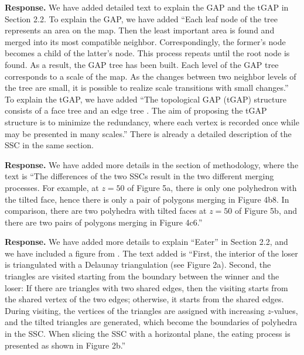 \documentclass[a4paper,twoside,11pt]{reviewresponse}
\begin{document}
\textbf{Response.}
We have added detailed text to explain the GAP and the tGAP 
in Section 2.2.
To explain the GAP, we have added
``Each leaf node of the tree represents an area on the map.
Then the least important area is found and 
merged into its most compatible neighbor.
Correspondingly, the former's node 
becomes a child of the latter's node.
This process repeats until the root node is found.
As a result, the GAP tree has been built.
Each level of the GAP tree corresponds to a scale of the map.
As the changes between two neighbor levels of the tree are small,
it is possible to realize scale transitions with small changes.''
To explain the tGAP, we have added 
``The topological GAP (tGAP) structure 
consists of a face tree and an edge tree \citep{vanOosterom2005}.
The aim of proposing the tGAP structure is to minimize the redundancy,
where each vertex is recorded once while may be presented in many scales.''
There is already a detailed description of the SSC in the same section.

\textbf{Response.}
We have added more details in the section of methodology,
where the text is
``The differences of the two SSCs result in 
the two different merging processes.
For example, at $z=50$ of Figure 5a, 
there is only one polyhedron with the tilted face,
hence there is only a pair of polygons merging in Figure 4b8.
In comparison, there are two polyhedra
with tilted faces at $z=50$ of Figure 5b,
and there are two pairs of polygons merging in Figure 4c6.''

\textbf{Response.}
We have added more details to explain ``Eater''
in Section 2.2, and we have included a figure from
\citet{Meijers2020Web}.
The text added is 
``First, the interior of the loser is triangulated
with a Delaunay triangulation
(see Figure 2a).
Second, the triangles are visited starting from the boundary
between the winner and the loser:
If there are triangles with two shared edges, 
then the visiting starts from the shared vertex of the two edges;
otherwise, it starts from the shared edges.
During visiting, the vertices of the triangles 
are assigned with increasing $z$-values,
and the tilted triangles are generated,
which become the boundaries of polyhedra in the SSC.
When slicing the SSC with a horizontal plane,
the eating process is presented as shown in Figure 2b.''
\end{document}
